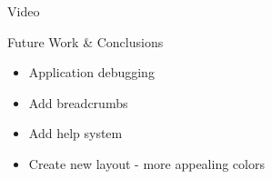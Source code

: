 \documentclass{beamer}
\begin{document}
\begin{frame}{Video}
\end{frame}

\begin{frame}{Future Work \& Conclusions}
    \begin{itemize}
        \item Application debugging
        \item Add breadcrumbs
        \item Add help system
        \item Create new layout - more appealing colors
    \end{itemize}
\end{frame}
\end{document}
